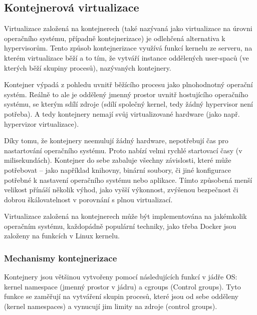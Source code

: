 \documentclass[thesis=M,czech]{FITthesis}[2019/12/23]
\theoremstyle{plain}
\theoremstyle{definition}
\begin{document}
\subsection{Kontejnerová virtualizace}


Virtualizace založená na kontejnerech (také nazývaná jako virtualizace na úrovni operačního systému, případně kontejnerizace) je odlehčená alternativa k hypervisorům. Tento způsob kontejnerizace využívá funkcí kernelu ze serveru, na kterém virtualizace běží a to tím, že vytváří instance oddělených user-spaců (ve kterých běží skupiny procesů), nazývaných kontejnery. 

Kontejner výpadá z pohledu uvnitř běžícího procesu jako plnohodnotný operační systém. Reálně to ale je oddělený jmenný prostor uvnitř hostujícího operačního systému, se kterým sdílí zdroje (sdílí společný kernel, tedy žádný hypervisor není potřeba). A tedy kontejnery nemají svůj virtualizované hardware (jako např. hypervizor virtualizace). 

Díky tomu, že kontejnery neemulují žádný hardware, nepotřebují čas pro nastartování operačního systému. Proto nabízí velmi rychlé startovací časy (v milisekundách). Kontejner do sebe zabaluje všechny závislosti, které může potřebovat -- jako například knihovny, binární soubory, či jiné konfigurace potřebné k nastavení operačního systému nebo aplikace. Tímto způsobená menší velikost přínáší několik výhod, jako vyšší výkonnost, zvýšenou bezpečnost či dobrou škálovatelnost v porovnání s plnou virtualizací.

Virtualizace založená na kontejnerech může být implementována na jakémkolik operačním systému, každopádně populární techniky, jako třeba Docker jsou založeny na funkcích v Linux kernelu. 


\subsubsection{Mechanismy kontejnerizace}

Kontejnery jsou většinou vytvořeny pomocí následujících funkcí v jádře OS: kernel namespace (jmenný prostor v jádru) a cgroups (Control groups). Tyto funkce se zaměřují na vytváření skupin procesů, které jsou od sebe odděleny (kernel namespaces) a vynucují jim limity na zdroje (control groups).

\end{document}
